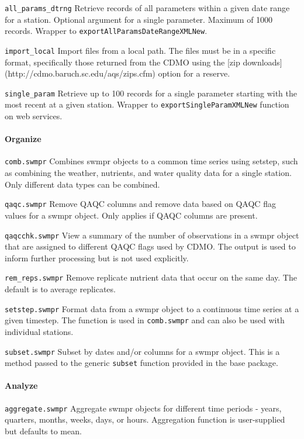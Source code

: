 \documentclass[10pt,letterpaper]{article}\usepackage[]{graphicx}\usepackage[]{color}
\begin{document}
\texttt{all\_params\_dtrng} Retrieve records of all parameters within a given date range for a station.  Optional argument for a single parameter.  Maximum of 1000 records. Wrapper to \texttt{exportAllParamsDateRangeXMLNew}.

\texttt{import\_local} Import files from a local path.  The files must be in a specific format, specifically those returned from the \ac{CDMO} using the [zip downloads](http://cdmo.baruch.sc.edu/aqs/zips.cfm) option for a reserve.

\texttt{single\_param} Retrieve up to 100 records for a single parameter starting with the most recent at a given station.  Wrapper to \texttt{exportSingleParamXMLNew} function on web services. 

\paragraph{Organize}

\texttt{comb.swmpr} Combines swmpr objects to a common time series using setstep, such as combining the weather, nutrients, and water quality data for a single station. Only different data types can be combined.

\texttt{qaqc.swmpr} Remove QAQC columns and remove data based on QAQC flag values for a swmpr object.  Only applies if QAQC columns are present.  

\texttt{qaqcchk.swmpr} View a summary of the number of observations in a swmpr object that are assigned to different QAQC flags used by \ac{CDMO}.  The output is used to inform further processing but is not used explicitly. 

\texttt{rem\_reps.swmpr} Remove replicate nutrient data that occur on the same day.  The default is to average replicates.

\texttt{setstep.swmpr} Format data from a swmpr object to a continuous time series at a given timestep.  The function is used in \texttt{comb.swmpr} and can also be used with individual stations.

\texttt{subset.swmpr} Subset by dates and/or columns for a swmpr object.  This is a method passed to the generic \texttt{subset} function provided in the base package.

\paragraph{Analyze}

\texttt{aggregate.swmpr} Aggregate swmpr objects for different time periods - years, quarters, months,  weeks, days, or hours.  Aggregation function is user-supplied but defaults to mean. 
\end{document}
